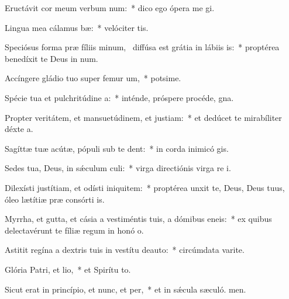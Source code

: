 \item Eructávit cor meum verbum num:~* dico ego ópera me gi.
\item Lingua mea cálamus bæ:~* velóciter tis.
\item Speciósus forma præ fíliis minum,~\pscross{} diffúsa est grátia in lábiis is:~* proptérea benedíxit te Deus in num.
\item Accíngere gládio tuo super femur um,~* potsime.
\item Spécie tua et pulchritúdine a:~* inténde, próspere procéde,  gna.
\item Propter veritátem, et mansuetúdinem, et justiam:~* et dedúcet te mirabíliter déxte a.
\item Sagíttæ tuæ acútæ, pópuli sub te dent:~* in corda inimicó gis.
\item Sedes tua, Deus, in sǽculum culi:~* virga directiónis virga re i.
\item Dilexísti justítiam, et odísti iniquitem:~* proptérea unxit te, Deus, Deus tuus, óleo lætítiæ præ consórti is.
\item Myrrha, et gutta, et cásia a vestiméntis tuis, a dómibus eneis:~* ex quibus delectavérunt te fíliæ regum in honó o.
\item Astitit regína a dextris tuis in vestítu deauto:~* circúmdata varite.
\item Glória Patri, et lio,~* et Spirítu to.
\item Sicut erat in princípio, et nunc, et per,~* et in sǽcula sæculó. men.
